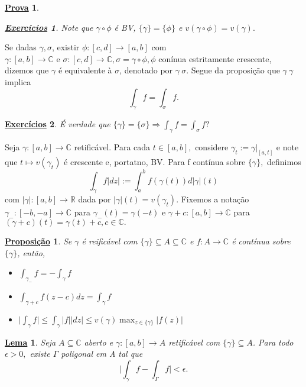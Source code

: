 \documentclass{article}
\newtheorem*{proof*}{\underline{Prova}}
\newtheorem*{prop*}{\underline{Proposi\c c\~ao}}
\newtheorem*{lmm*}{\underline{Lema}}
\newtheorem*{exer*}{\underline{Exerc\'icios}}
\begin{document}
\begin{proof*}
 \begin{exer*}
   Note que $\gamma\circ{\phi}$ \'e BV, $\{\gamma\}=\{\phi\} $ e $v(\gamma\circ{\phi}) = v(\gamma).$
 \end{exer*}
\end{proof*}
  Se dadas $\gamma, \sigma$, existir $\phi:[c, d]\rightarrow [a, b]$ com $\gamma:[a, b]\rightarrow \mathbb{C}\text{ e }\sigma:[c, d]\rightarrow \mathbb{C}, 
\sigma = \gamma\circ{\phi}, \phi$ con\'inua estritamente crescente, dizemos que $\gamma $ \'e equivalente \`a $\sigma$, denotado por $\gamma~\sigma.$
Segue da proposi\c c\~ao que $\gamma~\gamma$ implica 
  $$
  \int_{\gamma}^{}f = \int_{\sigma}^{}f.
  $$
 \begin{exer*}
   \'E verdade que $\{\gamma\}=\{\sigma\}\Rightarrow \int_{\gamma}^{}f = \int_{\sigma}^{}f?$
 \end{exer*}
   Seja $\gamma:[a, b]\rightarrow \mathbb{C}$ retific\'avel. Para cada $t\in{[a, b]},$ considere $\gamma_t:=\gamma|_[a, t]$ e 
note que $t\mapsto{v(\gamma_t)}$ \'e crescente e, portatno, BV. Para f cont\'inua sobre $\{\gamma\},$ definimos
  $$
  \int_{\gamma}^{}f|dz|:= \int_{a}^{b}f(\gamma(t))d|\gamma|(t)
  $$
  com $|\gamma|:[a, b]\rightarrow \mathbb{R}$ dada por $|\gamma|(t) = v(\gamma_t)$. Fixemos a nota\c c\~ao $\gamma_{-}:[-b, -a]\rightarrow \mathbb{C}$
  para $\gamma_{-}(t) = \gamma(-t)$ e $\gamma+c:[a, b]\rightarrow \mathbb{C}$ para $(\gamma + c)(t) = \gamma(t) + c, c\in \mathbb{C}.$
\begin{prop*}
  Se $\gamma$ \'e reific\'avel com $\{\gamma\}\subseteq{A}\subseteq{\mathbb{C}} $ e $f:A\rightarrow \mathbb{C}$ \'e cont\'inua sobre
  $\{\gamma\} $, ent\~ao, 
 \begin{itemize}
   \item[i)] $\int_{\gamma_{-}}^{}f = - \int_{\gamma}^{}f$
   \item[ii)] $\int_{\gamma+c}^{}f(z-c)dz = \int_{\gamma}^{}f$
   \item[iii)] $\biggl|\int_{\gamma}^{}f\biggr|\leq \int_{\gamma}^{}|f||dz|\leq v(\gamma)\max_{z\in \{\gamma\} }|f(z)|$
 \end{itemize}
\end{prop*}
\begin{lmm*}
  Seja $A\subseteq{\mathbb{C}}$ aberto e $\gamma:[a, b]\rightarrow A$ retific\'avel com $\{\gamma\}\subseteq{A}$. Para todo $\epsilon > 0,$
existe $\Gamma$ poligonal em A tal que 
  $$
  \biggl|\int_{\gamma}^{}f - \int_{\Gamma}^{}f\biggr| < \epsilon.
  $$
\end{lmm*}
\end{document}
